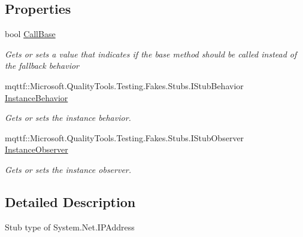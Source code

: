 \subsection*{Properties}
\begin{DoxyCompactItemize}
\item 
bool \hyperlink{class_system_1_1_net_1_1_fakes_1_1_stub_i_p_address_a2fd35145bd0b3875ef8c9c7e2fe1a9e5}{Call\-Base}
\begin{DoxyCompactList}\small\item\em Gets or sets a value that indicates if the base method should be called instead of the fallback behavior\end{DoxyCompactList}\item 
mqttf\-::\-Microsoft.\-Quality\-Tools.\-Testing.\-Fakes.\-Stubs.\-I\-Stub\-Behavior \hyperlink{class_system_1_1_net_1_1_fakes_1_1_stub_i_p_address_aad50414a9b6947a26aeb0d29d198a3b9}{Instance\-Behavior}
\begin{DoxyCompactList}\small\item\em Gets or sets the instance behavior.\end{DoxyCompactList}\item 
mqttf\-::\-Microsoft.\-Quality\-Tools.\-Testing.\-Fakes.\-Stubs.\-I\-Stub\-Observer \hyperlink{class_system_1_1_net_1_1_fakes_1_1_stub_i_p_address_a81bfbfb779635417dd72de3080b6ab83}{Instance\-Observer}
\begin{DoxyCompactList}\small\item\em Gets or sets the instance observer.\end{DoxyCompactList}\end{DoxyCompactItemize}


\subsection{Detailed Description}
Stub type of System.\-Net.\-I\-P\-Address



